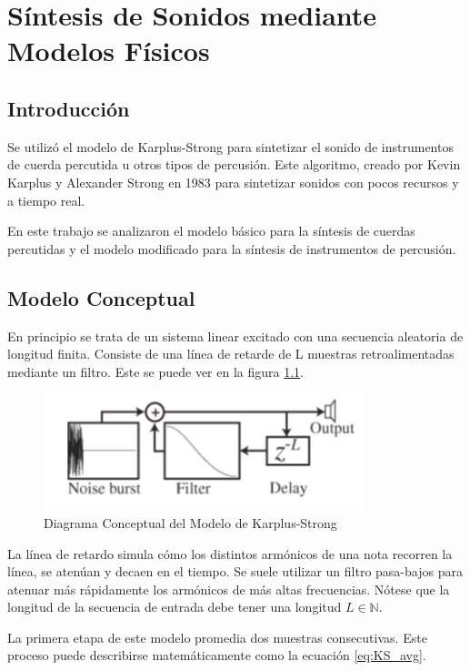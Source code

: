 \chapter{Síntesis de Sonidos mediante Modelos Físicos}

\section{Introducción}
Se utilizó el modelo de Karplus-Strong para sintetizar el sonido de instrumentos de cuerda percutida u otros tipos de percusión. Este algoritmo, creado por Kevin Karplus y Alexander Strong en 1983 para sintetizar sonidos con pocos recursos y a tiempo real.

En este trabajo se analizaron el modelo básico para la síntesis de cuerdas percutidas y el modelo modificado para la síntesis de instrumentos de percusión.

\section{Modelo Conceptual}

En principio se trata de un sistema linear excitado con una secuencia aleatoria de longitud finita. Consiste de una línea de retarde de L muestras retroalimentadas mediante un filtro. Este se puede ver en la figura \ref{fig:KS_model}.

\begin{figure}[ht]
    \centering
    \includegraphics{res/ks_concept.jpg}
    \caption{Diagrama Conceptual del Modelo de Karplus-Strong}
    \label{fig:KS_model}
\end{figure}

La línea de retardo simula cómo los distintos armónicos de una nota recorren la línea, se atenúan y decaen en el tiempo. Se suele utilizar un filtro pasa-bajos para atenuar más rápidamente los armónicos de más altas frecuencias. Nótese que la longitud de la secuencia de entrada debe tener una longitud $L \in \mathbb{N}$.

La primera etapa de este modelo promedia dos muestras consecutivas. Este proceso puede describirse matemáticamente como la ecuación \eqref{eq:KS_avg}.

